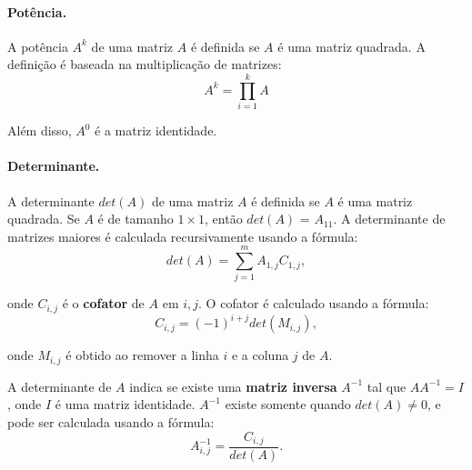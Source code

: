 \paragraph{Potência.} A potência $A^k$ de uma matriz $A$ é definida se $A$ é uma matriz quadrada. A definição é baseada na multiplicação de matrizes:
$$A^k = \prod_{i=1}^{k}A$$

Além disso, $A^0$ é a matriz identidade.

\paragraph{Determinante.} A determinante $det(A)$ de uma matriz $A$ é definida se $A$ é uma matriz quadrada. Se $A$ é de tamanho $1\times 1$, então $det(A)$ = $A_{11}$. A determinante de matrizes maiores é calculada recursivamente usando a fórmula:
$$det(A) = \sum_{j=1}^{m}A_{1,j}C_{1,j},$$

onde $C_{i,j}$ é o \textbf{cofator} de $A$ em $i,j$. O cofator é calculado usando a fórmula:
$$C_{i,j} = (-1)^{i+j}det(M_{i,j}),$$

onde $M_{i,j}$ é obtido ao remover a linha $i$ e a coluna $j$ de $A$.

A determinante de $A$ indica se existe uma \textbf{matriz inversa} $A^{-1}$ tal que $AA^{-1} = I$, onde $I$ é uma matriz identidade. $A^{-1}$ existe somente quando $det(A) \neq 0$, e pode ser calculada usando a fórmula:
$$A^{-1}_{i,j} = \frac{C_{i,j}}{det(A)}.$$
